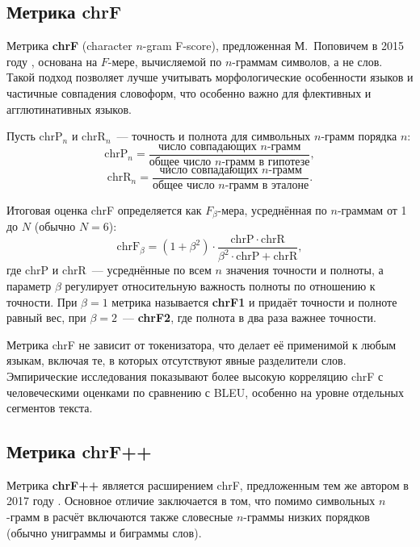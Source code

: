 \documentclass[14pt,a4paper]{extreport}
\begin{document}
\subsection{Метрика chrF}

Метрика \textbf{chrF} (character $n$-gram F-score), предложенная М.~Поповичем в 2015 году \cite{popovic2015chrf}, основана на $F$-мере, вычисляемой по $n$-граммам символов, а не слов. Такой подход позволяет лучше учитывать морфологические особенности языков и частичные совпадения словоформ, что особенно важно для флективных и агглютинативных языков.


Пусть $\mathrm{chrP}_n$ и $\mathrm{chrR}_n$~--- точность и полнота для символьных $n$-грамм порядка $n$:
\begin{equation}
\mathrm{chrP}_n = \frac{\text{число совпадающих } n\text{-грамм}}{\text{общее число } n\text{-грамм в гипотезе}},
\end{equation}
\begin{equation}
\mathrm{chrR}_n = \frac{\text{число совпадающих } n\text{-грамм}}{\text{общее число } n\text{-грамм в эталоне}}.
\end{equation}


Итоговая оценка chrF определяется как $F_\beta$-мера, усреднённая по $n$-граммам от 1 до $N$ (обычно $N = 6$):
\begin{equation}
\mathrm{chrF}_\beta = (1 + \beta^2) \cdot \frac{\mathrm{chrP} \cdot \mathrm{chrR}}{\beta^2 \cdot \mathrm{chrP} + \mathrm{chrR}},
\end{equation}
где $\mathrm{chrP}$ и $\mathrm{chrR}$~--- усреднённые по всем $n$ значения точности и полноты, а параметр $\beta$ регулирует относительную важность полноты по отношению к точности. При $\beta = 1$ метрика называется \textbf{chrF1} и придаёт точности и полноте равный вес, при $\beta = 2$~--- \textbf{chrF2}, где полнота в два раза важнее точности.


Метрика chrF не зависит от токенизатора, что делает её применимой к любым языкам, включая те, в которых отсутствуют явные разделители слов. Эмпирические исследования показывают более высокую корреляцию chrF с человеческими оценками по сравнению с BLEU, особенно на уровне отдельных сегментов текста.

\subsection{Метрика chrF++}

Метрика \textbf{chrF++} является расширением chrF, предложенным тем же автором в 2017 году \cite{popovic2017chrf}. Основное отличие заключается в том, что помимо символьных $n$-грамм в расчёт включаются также словесные $n$-граммы низких порядков (обычно униграммы и биграммы слов).
\end{document}
